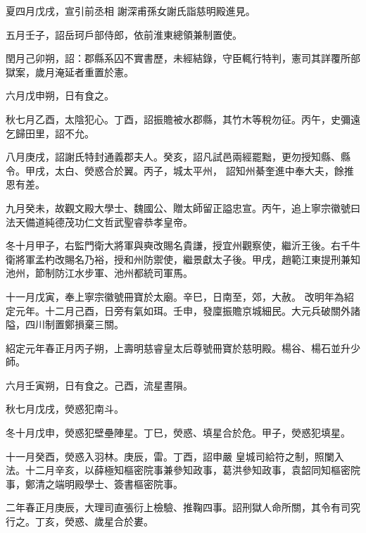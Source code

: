 \begin{pinyinscope}
 夏四月戊戌，宣引前丞相
 謝深甫孫女謝氏詣慈明殿進見。



 五月壬子，詔岳珂戶部侍郎，依前淮東總領兼制置使。



 閏月己卯朔，詔：郡縣系囚不實書歷，未經結錄，守臣輒行特判，憲司其詳覆所部獄案，歲月淹延者重置於憲。



 六月戊申朔，日有食之。



 秋七月乙酉，太陰犯心。丁酉，詔振贍被水郡縣，其竹木等稅勿征。丙午，史彌遠乞歸田里，詔不允。



 八月庚戌，詔謝氏特封通義郡夫人。癸亥，詔凡試邑兩經罷黜，更勿授知縣、縣令。甲戌，太白、熒惑合於翼。丙子，城太平州，
 詔知州綦奎進中奉大夫，餘推恩有差。



 九月癸未，故觀文殿大學士、魏國公、贈太師留正謚忠宣。丙午，追上寧宗徽號曰法天備道純德茂功仁文哲武聖睿恭孝皇帝。



 冬十月甲子，右監門衛大將軍與奭改賜名貴謙，授宜州觀察使，繼沂王後。右千牛衛將軍孟杓改賜名乃裕，授和州防禦使，繼景獻太子後。甲戌，趙範江東提刑兼知池州，節制防江水步軍、池州都統司軍馬。



 十一月戊寅，奉上寧宗徽號冊寶於太廟。辛巳，日南至，郊，大赦。
 改明年為紹定元年。十二月己酉，日旁有氣如珥。壬申，發廩振贍京城細民。大元兵破關外諸隘，四川制置鄭損棄三關。



 紹定元年春正月丙子朔，上壽明慈睿皇太后尊號冊寶於慈明殿。楊谷、楊石並升少師。



 六月壬寅朔，日有食之。己酉，流星晝隕。



 秋七月戊戌，熒惑犯南斗。



 冬十月戊申，熒惑犯壁壘陣星。丁巳，熒惑、填星合於危。甲子，熒惑犯填星。



 十一月癸酉，熒惑入羽林。庚辰，雷。丁酉，詔申嚴
 皇城司給符之制，照闌入法。十二月辛亥，以薛極知樞密院事兼參知政事，葛洪參知政事，袁韶同知樞密院事，鄭清之端明殿學士、簽書樞密院事。



 二年春正月庚辰，大理司直張衍上檢驗、推鞠四事。詔刑獄人命所關，其令有司究行之。丁亥，熒惑、歲星合於婁。




\end{pinyinscope}
